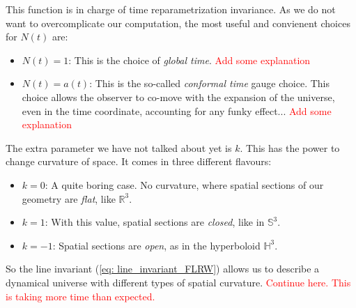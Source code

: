 \documentclass[11pt, a4paper]{article} %
\renewcommand{\it}{\textit}
\begin{document}
This function is in charge of time reparametrization invariance. As we do not want to overcomplicate our computation, the most useful and convienent choices for $N(t)$ are:

\begin{itemize}
	\item $N(t) = 1$: This is the choice of \textit{global time}. \textcolor{red}{Add some explanation}
	\item $N(t) = a(t)$: This is the so-called \textit{conformal time} gauge choice. This choice allows the observer to co-move with the expansion of the universe, even in the time coordinate, accounting for any funky effect... \textcolor{red}{Add some explanation}
\end{itemize}

The extra parameter we have not talked about yet is $k$. This has the power to change curvature of space. It comes in three different flavours:

\begin{itemize}
	\item $k = 0$: A quite boring case. No curvature, where spatial sections of our geometry are \it{flat}, like $\mathbb{R}^{3}$.
	\item $k = 1$: With this value, spatial sections are \it{closed}, like in $\mathbb{S}^{3}$.
	\item $k = -1$: Spatial sections are \it{open}, as in the hyperboloid $\mathbb{H}^{3}$.
\end{itemize}

So the line invariant (\ref{eq: line_invariant_FLRW}) allows us to describe a dynamical universe with different types of spatial curvature. \textcolor{red}{Continue here. This is taking more time than expected.}




\cite{Danielsson:2018ztv}







\end{document}
